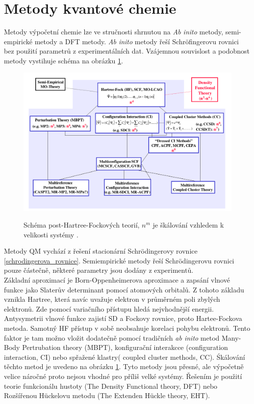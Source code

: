 \documentclass[
  digital, %
  table,   %
  lof,     %
  lot,     %
]{fithesis3}
\begin{document}
\section{Metody kvantové chemie}
Metody výpočetní chemie lze ve stručnosti shrnutou na \textit{Ab inito} metody, semi-empirické metody a DFT metody. \textit{Ab inito} metody řeší Schröfingerovu rovnici bez použití parametrů z experimentálních dat.  Vzájemnou souvislost a podobnost metody vystihuje schéma na obrázku \ref{schema_QM}.
 \begin{figure}[h]
\caption{Schéma post-Hartree-Fockových teorií, $n^m$ je škálování vzhledem k velikosti systémy \cite{pdf_obrazek}. }
  \center
  \includegraphics[width=12cm]{schema_QM.png}
  \label{schema_QM}
  \end{figure}
  Metody QM vychází z řešení stacionární Schrödingerovy rovnice \ref{schrodingerova_rovnice}. Semiempirické metody řeší Schrödingerovu rovnici pouze částečně, některé parametry jsou dodány z experimentů. \\
     Základní aproximací je Born-Oppenheimerova aproximace a zapsání vlnové funkce jako Slaterův determinant pomocí atomových orbitalů. Z tohoto základu vznikla Hartree, která navíc uvažuje elektron v průměrném poli zbylých elektronů. Zde pomocí variačního přístupu hledá nejvhodnější energii. Antysymetrii vlnové funkce zajistí SD a Fockovy rovnice, proto Hartee-Fockova metoda. Samotný HF přístup v sobě neobsahuje korelaci pohybu elektronů. Tento faktor je tam možno vložit dodatečně pomocí tradičních \textit{ab inito} metod Many-Body Pertrubation  theory (MBPT), konfigurační interakcce (configuration interaction, CI) nebo spřažené klastry( coupled cluster methods, CC). Śkálování těchto metod je uvedeno na obrázku \ref{schema_QM}. Tyto metody jsou přesné, ale výpočetně velice náročné proto nejsou vhodné pro příliš velké systémy. Řešením je použití teorie funkcionálu hustoty (The Density Functional theory, DFT) nebo Rozšířenou Hückelovu metodu (The Extenden Hückle theory, EHT).
\end{document}
